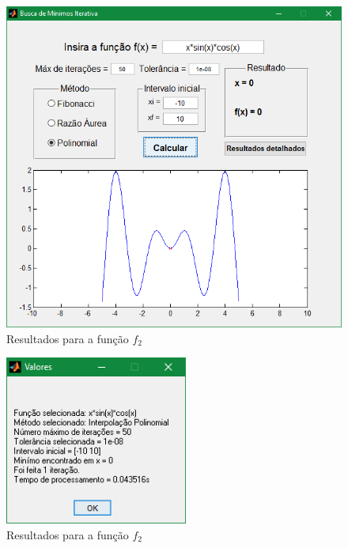 \begin{figure}[H]
	\begin{center}	
		\includegraphics[width=14cm]{../interpol/f2_gui.PNG}
		\caption{Resultados para a função $f_2$}
		\label{fig:f2_gui}
	\end{center}
\end{figure}

\begin{figure}[H]
	\begin{center}	
		\includegraphics[width=6cm]{../interpol/f2_resultados.PNG}
		\caption{Resultados para a função $f_2$}
		\label{fig:f2_resultados}
	\end{center}
\end{figure}

